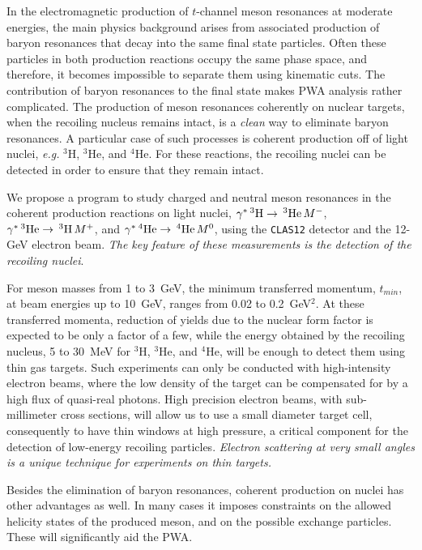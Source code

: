 In the electromagnetic production of $t$-channel meson resonances
at moderate energies, the main physics background arises from
associated production of baryon resonances that decay into the same
final state particles.  Often these particles in both production reactions
occupy the same phase space, and therefore, it becomes impossible to
separate them using kinematic cuts. The contribution of baryon
resonances to the final state makes PWA analysis rather complicated. The 
production of meson resonances coherently on nuclear targets, when the
recoiling nucleus remains intact, is a {\it clean} way to eliminate
baryon resonances. A particular case of such processes is coherent 
production off of light nuclei, {\it e.g.} $^3$H, $^3$He, and $^4$He. For
these reactions, the recoiling nuclei can be detected in order to ensure 
that they remain intact.

We propose a program to study charged and neutral meson resonances in
the coherent production reactions on light nuclei,
$\gamma^* \,^3{\rm H}  \to \,^3{\rm He}\,M^-$, 
$\gamma^* \,^3{\rm He} \to \,^3{\rm H} \,M^+$, and
$\gamma^* \,^4{\rm He} \to \,^4{\rm He}\,M^0$, 
using the {\tt CLAS12} detector and the 12-GeV electron beam. 
{\it The key feature of these measurements is the detection of the 
recoiling nuclei}.

For meson masses from 1 to 3~GeV, the minimum transferred momentum, 
$t_{min}$, at beam energies up to 10~GeV, ranges from 0.02 to 0.2~GeV$^2$. 
At these transferred momenta, reduction of yields due to the nuclear form 
factor is expected to be only a factor of a few, while the energy obtained 
by the recoiling nucleus, 5 to 30~MeV for $^3$H, $^3$He, and $^4$He, will 
be enough to detect them using thin gas targets. Such experiments can 
only be conducted with high-intensity electron beams, where the low density 
of the target can be compensated for by a high flux of quasi-real photons. 
High precision electron beams, with sub-millimeter cross sections, will 
allow us to use a small diameter target cell, consequently to have thin 
windows at high pressure, a critical component for the detection of 
low-energy recoiling particles.  {\it Electron scattering at very small 
angles is a unique technique for experiments on thin targets.}

Besides the elimination of baryon resonances, coherent production on
nuclei has other advantages as well. In many cases it imposes constraints
on the allowed helicity states of the produced meson, and on the possible
exchange particles. These will significantly aid the PWA.

